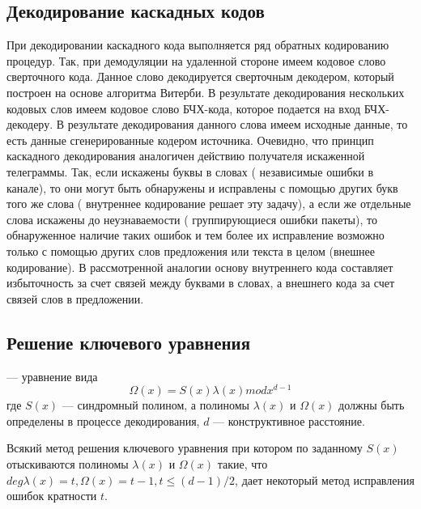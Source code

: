 \subsection{Декодирование каскадных кодов}
При декодировании каскадного кода выполняется ряд обратных кодированию процедур. Так, при демодуляции на 
удаленной стороне имеем кодовое слово сверточного кода. Данное слово декодируется сверточным декодером, 
который построен на основе алгоритма Витерби. В результате декодирования нескольких кодовых слов имеем 
кодовое слово БЧХ-кода, которое подается на вход БЧХ-декодеру. В результате декодирования данного слова 
имеем исходные данные, то есть данные сгенерированные кодером источника.  Очевидно, что принцип каскадного 
декодирования аналогичен действию получателя искаженной телеграммы. Так, если искажены буквы в словах (
независимые ошибки в канале), то они могут быть обнаружены и исправлены с помощью других букв того же слова (
внутреннее кодирование решает эту задачу), а если же отдельные слова искажены до неузнаваемости ( 
группирующиеся ошибки пакеты), то обнаруженное наличие таких ошибок и тем более их исправление возможно 
только с помощью других слов предложения или текста в целом (внешнее кодирование). В рассмотренной аналогии 
основу внутреннего кода составляет избыточность за счет связей между буквами в словах, а внешнего кода за 
счет связей слов в предложении.

\subsection{Решение ключевого уравнения}
\begin{definition} 
 --- уравнение вида 
$$\Omega(x)=S(x)\lambda(x)mod x^{d-1}$$
где $S(x)$ --- синдромный полином, а полиномы $\lambda(x)$ и $\Omega(x)$ должны быть определены в 
процессе декодирования, $d$ --- конструктивное расстояние.
\end{definition}

Всякий метод решения ключевого уравнения при котором по заданному $S(x)$ отыскиваются полиномы $\lambda(x)$ 
и $\Omega(x)$ такие, что $deg\lambda(x)=t, \Omega(x)=t-1, t\le(d-1)/2$, дает некоторый метод исправления
ошибок кратности $t$.
